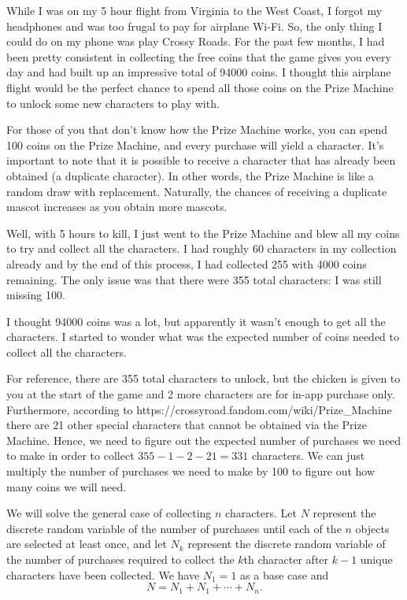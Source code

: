 While I was on my 5 hour flight from Virginia to the West Coast, I forgot my headphones and was too frugal to pay for airplane Wi-Fi. So, the only thing I could do on my phone was play Crossy Roads. For the past few months, I had been pretty consistent in collecting the free coins that the game gives you every day and had built up an impressive total of 94000 coins. I thought this airplane flight would be the perfect chance to spend all those coins on the Prize Machine to unlock some new characters to play with. 

For those of you that don't know how the Prize Machine works, you can spend 100 coins on the Prize Machine, and every purchase will yield a character. It's important to note that it is possible to receive a character that has already been obtained (a duplicate character). In other words, the Prize Machine is like a random draw with replacement. Naturally, the chances of receiving a duplicate mascot increases as you obtain more mascots.

Well, with 5 hours to kill, I just went to the Prize Machine and blew all my coins to try and collect all the characters. I had roughly 60 characters in my collection already and by the end of this process, I had collected 255 with 4000 coins remaining. The only issue was that there were 355 total characters: I was still missing 100. 

I thought 94000 coins was a lot, but apparently it wasn't enough to get all the characters. I started to wonder what was the expected number of coins needed to collect all the characters. 

For reference, there are 355 total characters to unlock, but the chicken is given to you at the start of the game and 2 more characters are for in-app purchase only. Furthermore, according to https://crossyroad.fandom.com/wiki/Prize_Machine there are 21 other special characters that cannot be obtained via the Prize Machine. Hence, we need to figure out the expected number of purchases we need to make in order to collect $355-1-2-21=331$ characters. We can just multiply the number of purchases we need to make by 100 to figure out how many coins we will need.

We will solve the general case of collecting $n$ characters. Let $N$ represent the discrete random variable of the number of purchases until each of the
$n$ objects are selected at least once, and let $N_k$ represent the discrete random variable of the number of purchases required to collect the $k$th character after $k-1$ unique characters have been collected. We have $N_1=1$ as a base case and $$N=N_1+N_1+\cdots+N_n.$$ 

